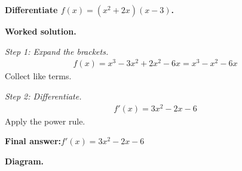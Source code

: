 \documentclass[11pt]{article}
\newcommand{\question}[1]{\par\medskip\noindent\textbf{#1}\par}
\begin{document}
\question{Differentiate \( f(x) = (x^2 + 2x)(x - 3) \).}

\textbf{Worked solution.}

\textit{Step 1: Expand the brackets.}
\[\begin{gathered}
f(x) = x^3 - 3x^2 + 2x^2 - 6x = x^3 - x^2 - 6x
\end{gathered}\]
Collect like terms.

\textit{Step 2: Differentiate.}
\[\begin{gathered}
f'(x) = 3x^2 - 2x - 6
\end{gathered}\]
Apply the power rule.

\begin{answerbox}
\textbf{Final answer:}\quad \(\displaystyle  f'(x) = 3x^2 - 2x - 6 \)
\end{answerbox}
\textbf{Diagram.}
\end{document}

